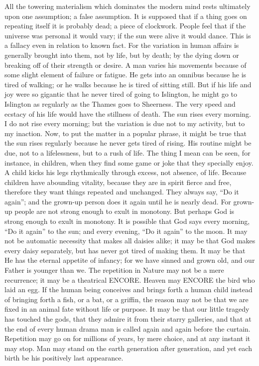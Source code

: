 All the towering materialism which dominates the modern mind rests ultimately upon one assumption; a false assumption. It is supposed that if a thing goes on repeating itself it is probably dead; a piece of clockwork. People feel that if the universe was personal it would vary; if the sun were alive it would dance. This is a fallacy even in relation to known fact. For the variation in human affairs is generally brought into them, not by life, but by death; by the dying down or breaking off of their strength or desire. A man varies his movements because of some slight element of failure or fatigue. He gets into an omnibus because he is tired of walking; or he walks because he is tired of sitting still. But if his life and joy were so gigantic that he never tired of going to Islington, he might go to Islington as regularly as the Thames goes to Sheerness. The very speed and ecstacy of his life would have the stillness of death. The sun rises every morning. I do not rise every morning; but the variation is due not to my activity, but to my inaction. Now, to put the matter in a popular phrase, it might be true that the sun rises regularly because he never gets tired of rising. His routine might be due, not to a lifelessness, but to a rush of life. The thing I mean can be seen, for instance, in children, when they find some game or joke that they specially enjoy. A child kicks his legs rhythmically through excess, not absence, of life. Because children have abounding vitality, because they are in spirit fierce and free, therefore they want things repeated and unchanged. They always say, “Do it again”; and the grown-up person does it again until he is nearly dead. For grown-up people are not strong enough to exult in monotony. But perhaps God is strong enough to exult in monotony. It is possible that God says every morning, “Do it again” to the sun; and every evening, “Do it again” to the moon. It may not be automatic necessity that makes all daisies alike; it may be that God makes every daisy separately, but has never got tired of making them. It may be that He has the eternal appetite of infancy; for we have sinned and grown old, and our Father is younger than we. The repetition in Nature may not be a mere recurrence; it may be a theatrical ENCORE. Heaven may ENCORE the bird who laid an egg. If the human being conceives and brings forth a human child instead of bringing forth a fish, or a bat, or a griffin, the reason may not be that we are fixed in an animal fate without life or purpose. It may be that our little tragedy has touched the gods, that they admire it from their starry galleries, and that at the end of every human drama man is called again and again before the curtain. Repetition may go on for millions of years, by mere choice, and at any instant it may stop. Man may stand on the earth generation after generation, and yet each birth be his positively last appearance.

